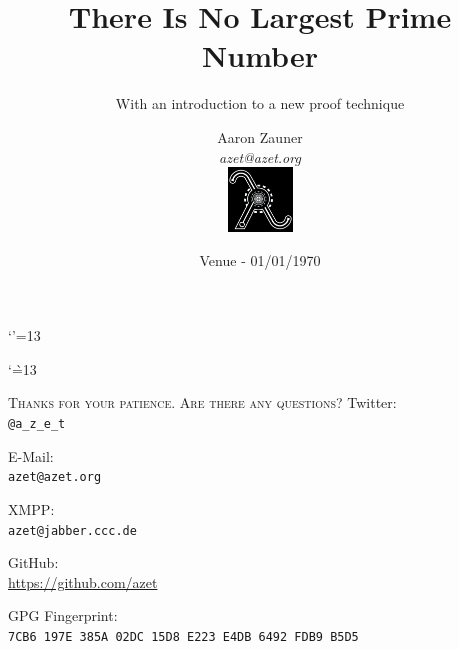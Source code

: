 \documentclass[hyperref={draft}, aspectratio=169]{beamer}
\title{There Is No Largest Prime Number}
\subtitle{With an introduction to a new proof technique}
\author[Aaron Zauner]{Aaron Zauner\\
        \textit{azet@azet.org}\\
        \includegraphics[height=65px,width=65px]{lambda}
       }
\institute{lambda.co.at:\\Highly-Available, Scalable \& Secure Distributed Systems}
\date{Venue - 01/01/1970}
\begin{document}
\makeatletter
\let \@sverbatim \@verbatim
\def \@verbatim {\@sverbatim \verbatimplus}
{\catcode`'=13 \gdef \verbatimplus{\catcode`'=13 \chardef '=13 }} 
\makeatother

\makeatletter
{\catcode`\`=13
\xdef\@verbatim{\unexpanded\expandafter{\@verbatim}\chardef\noexpand`=18 }
}
\makeatother

{

\begin{frame}
  \titlepage
\end{frame}

}
\addtocounter{framenumber}{-1}

{

\begin{frame}
  \tableofcontents
\end{frame}

}
\addtocounter{framenumber}{-1}





\begin{frame}
  \begin{center}
    \textsc{Thanks for your patience. Are there any questions?}
    \vfill
    Twitter:\\
    \texttt{@a\_z\_e\_t}

    \vfill
    E-Mail:\\
    \texttt{azet@azet.org}

    \vfill
    XMPP:\\
    \texttt{azet@jabber.ccc.de}

    \vfill
    GitHub:\\
    \url{https://github.com/azet}

    \vfill
    GPG Fingerprint:\\
    \texttt{7CB6 197E 385A 02DC 15D8 E223 E4DB 6492 FDB9 B5D5}
  \end{center}
\end{frame}


\end{document}
